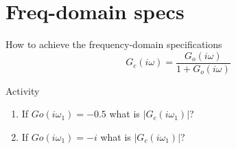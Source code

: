 \documentclass[presentation,aspectratio=169]{beamer}
\begin{document}
\section{Freq-domain specs}
\label{sec:org3d68912}
\begin{frame}[label={sec:org946914f}]{How to achieve the frequency-domain specifications}
\[G_c(i\omega) = \frac{ G_o(i\omega)}{1 + G_o(i\omega)}\]

\alert{Activity}
\begin{enumerate}
\item If \(Go(i\omega_1) = -0.5\) what is \(|G_c(i\omega_1)|\)?
\item If \(Go(i\omega_1) = -i\) what is \(|G_c(i\omega_1)|\)?
\end{enumerate}
\end{frame}
\end{document}
